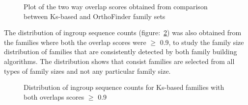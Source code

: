 \documentclass{article}
\begin{document}
		\begin{figure}[h!]
			\caption{Plot of the two way overlap scores obtained from comparison between Ks-based and OrthoFinder family sets}
			\label{fig:scatter_lgf5_vs_orthofinder_overlap_lgf5}
		\end{figure}
		
		The distribution of ingroup sequence counts (figure:~\ref{fig:hist_seq_ct_lgf5_vs_orthofinder_90percent_overlap}) was also obtained from the families where both the overlap scores were $\geq$ 0.9, to study the family size distribution of families that are consistently detected by both family building algorithms. The distribution shows that consist families are selected from all types of family sizes and not any particular family size.
		
		\begin{figure}[h!]
			\caption{Distribution of ingroup sequence counts for Ks-based families with both overlaps scores $\geq$ 0.9 }
			\label{fig:hist_seq_ct_lgf5_vs_orthofinder_90percent_overlap}
		\end{figure}
		
\end{document}
